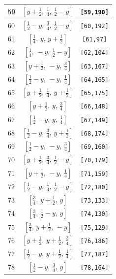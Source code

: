 \documentclass[fleqn,8pt]{jsarticle}
\begin{document}
\begin{longtable}{ccc}
59 & $\left[ y + \frac{1}{2},\, \frac{1}{4},\, \frac{1}{2} - y \right]$ & {\tt [59,190]} \\ \hline
60 & $\left[ \frac{1}{2} - y,\, \frac{3}{4},\, \frac{1}{2} - y \right]$ & {\tt [60,192]} \\ \hline
61 & $\left[ \frac{1}{4},\, y,\, y + \frac{1}{2} \right]$ & {\tt [61,97]} \\ \hline
62 & $\left[ \frac{1}{4},\, - y,\, \frac{1}{2} - y \right]$ & {\tt [62,104]} \\ \hline
63 & $\left[ y + \frac{1}{2},\, - y,\, \frac{3}{4} \right]$ & {\tt [63,167]} \\ \hline
64 & $\left[ \frac{1}{2} - y,\, - y,\, \frac{1}{4} \right]$ & {\tt [64,165]} \\ \hline
65 & $\left[ y + \frac{1}{2},\, \frac{1}{4},\, y + \frac{1}{2} \right]$ & {\tt [65,175]} \\ \hline
66 & $\left[ y + \frac{1}{2},\, y,\, \frac{3}{4} \right]$ & {\tt [66,148]} \\ \hline
67 & $\left[ \frac{1}{2} - y,\, y,\, \frac{1}{4} \right]$ & {\tt [67,149]} \\ \hline
68 & $\left[ \frac{1}{2} - y,\, \frac{3}{4},\, y + \frac{1}{2} \right]$ & {\tt [68,174]} \\ \hline
69 & $\left[ \frac{1}{2} - y,\, - y,\, \frac{3}{4} \right]$ & {\tt [69,160]} \\ \hline
70 & $\left[ y + \frac{1}{2},\, \frac{3}{4},\, \frac{1}{2} - y \right]$ & {\tt [70,179]} \\ \hline
71 & $\left[ y + \frac{1}{2},\, - y,\, \frac{1}{4} \right]$ & {\tt [71,159]} \\ \hline
72 & $\left[ \frac{1}{2} - y,\, \frac{1}{4},\, \frac{1}{2} - y \right]$ & {\tt [72,180]} \\ \hline
73 & $\left[ \frac{3}{4},\, y + \frac{1}{2},\, y \right]$ & {\tt [73,133]} \\ \hline
74 & $\left[ \frac{3}{4},\, \frac{1}{2} - y,\, y \right]$ & {\tt [74,130]} \\ \hline
75 & $\left[ \frac{3}{4},\, y + \frac{1}{2},\, - y \right]$ & {\tt [75,129]} \\ \hline
76 & $\left[ y + \frac{1}{2},\, y + \frac{1}{2},\, \frac{3}{4} \right]$ & {\tt [76,186]} \\ \hline
77 & $\left[ \frac{1}{2} - y,\, y + \frac{1}{2},\, \frac{1}{4} \right]$ & {\tt [77,187]} \\ \hline
78 & $\left[ \frac{1}{2} - y,\, \frac{3}{4},\, y \right]$ & {\tt [78,164]} \\ \hline

\end{longtable}
\end{document}

